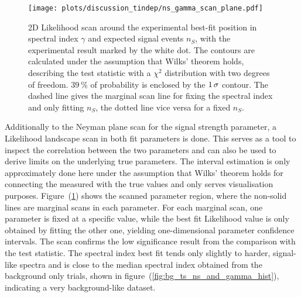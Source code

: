 \begin{figure}[htbp]
  \centering
  \texttt{[image: plots/discussion\_tindep/ns\_gamma\_scan\_plane.pdf]}
  \caption[2D LLH scan of $n_S$ and $\gamma$ for the time-integrated analysis]{
    2D Likelihood scan around the experimental best-fit position in spectral index $\gamma$ and expected signal events $n_S$, with the experimental result marked by the white dot.
    The contours are calculated under the assumption that Wilks' theorem holds, describing the test statistic with a $\chi^2$ distribution with two degrees of freedom.
    $\SI{39}{\percent}$ of probability is enclosed by the $\num{1}\,\sigma$ contour.
    The dashed line gives the marginal scan line for fixing the spectral index and only fitting $n_S$, the dotted line vice versa for a fixed $n_S$.
  }
  \label{fig:ns_gamma_scan_plane}
\end{figure}

Additionally to the Neyman plane scan for the signal strength parameter, a Likelihood landscape scan in both fit parameters is done.
This serves as a tool to inspect the correlation between the two parameters and can also be used to derive limits on the underlying true parameters.
The interval estimation is only approximately done here under the assumption that Wilks' theorem holds for connecting the measured with the true values and only serves visualisation purposes.
Figure~(\ref{fig:ns_gamma_scan_plane}) shows the scanned parameter region, where the non-solid lines are marginal scans in each parameter.
For each marginal scan, one parameter is fixed at a specific value, while the best fit Likelihood value is only obtained by fitting the other one, yielding one-dimensional parameter confidence intervals.
The scan confirms the low significance result from the comparison with the test statistic.
The spectral index best fit tends only slightly to harder, signal-like spectra and is close to the median spectral index obtained from the background only trials, shown in figure~(\ref{fig:bg_ts_ns_and_gamma_hist}), indicating a very background-like dataset.

